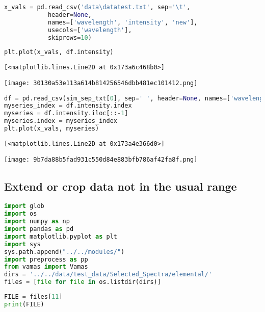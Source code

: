 \begin{lstlisting}[language=Python]
x_vals = pd.read_csv('data\datatest.txt', sep='\t', 
            header=None, 
            names=['wavelength', 'intensity', 'new'],
            usecols=['wavelength'],
            skiprows=10)
\end{lstlisting}

\begin{lstlisting}[language=Python]
plt.plot(x_vals, df.intensity)
\end{lstlisting}

\begin{lstlisting}
[<matplotlib.lines.Line2D at 0x173a6c468b0>]
\end{lstlisting}

\texttt{[image: 30130a53e113a614b814256546dbb481ec101412.png]}

\begin{lstlisting}[language=Python]
df = pd.read_csv(sim_sep_txt[0], sep=' ', header=None, names=['wavelength', 'intensity', ''])
myseries_index = df.intensity.index
myseries = df.intensity.iloc[::-1]
myseries.index = myseries_index
plt.plot(x_vals, myseries)
\end{lstlisting}

\begin{lstlisting}
[<matplotlib.lines.Line2D at 0x173a4e366d0>]
\end{lstlisting}

\texttt{[image: 9b7da88b5fad931c550d84e883bfb786af42fa8f.png]}

\hypertarget{extend-or-crop-data-not-in-the-usual-range}{%
\subsection{Extend or crop data not in the usual
range}\label{extend-or-crop-data-not-in-the-usual-range}}

\begin{lstlisting}[language=Python]
import glob
import os
import numpy as np
import pandas as pd
import matplotlib.pyplot as plt
import sys
sys.path.append("../../modules/")
import preprocess as pp
from vamas import Vamas
dirs = '../../data/test_data/Selected_Spectra/elemental/'
files = [file for file in os.listdir(dirs)]
\end{lstlisting}

\begin{lstlisting}[language=Python]
FILE = files[11]
print(FILE)
\end{lstlisting}

